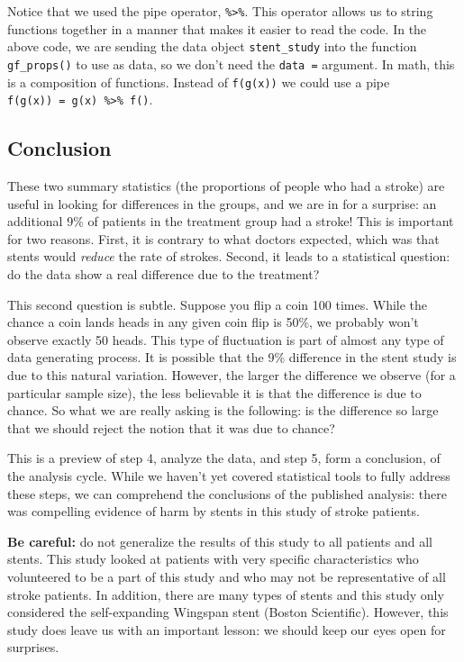 \documentclass[
  letterpaper,
  DIV=11,
  numbers=noendperiod]{scrreprt}
\begin{document}
Notice that we used the pipe operator, \texttt{\%\textgreater{}\%}. This
operator allows us to string functions together in a manner that makes
it easier to read the code. In the above code, we are sending the data
object \texttt{stent\_study} into the function \texttt{gf\_props()} to
use as data, so we don't need the \texttt{data\ =} argument. In math,
this is a composition of functions. Instead of \texttt{f(g(x))} we could
use a pipe \texttt{f(g(x))\ =\ g(x)\ \%\textgreater{}\%\ f()}.

\subsection{Conclusion}\label{conclusion}

These two summary statistics (the proportions of people who had a
stroke) are useful in looking for differences in the groups, and we are
in for a surprise: an additional 9\% of patients in the treatment group
had a stroke! This is important for two reasons. First, it is contrary
to what doctors expected, which was that stents would \emph{reduce} the
rate of strokes. Second, it leads to a statistical question: do the data
show a real difference due to the treatment?

This second question is subtle. Suppose you flip a coin 100 times. While
the chance a coin lands heads in any given coin flip is 50\%, we
probably won't observe exactly 50 heads. This type of fluctuation is
part of almost any type of data generating process. It is possible that
the 9\% difference in the stent study is due to this natural variation.
However, the larger the difference we observe (for a particular sample
size), the less believable it is that the difference is due to chance.
So what we are really asking is the following: is the difference so
large that we should reject the notion that it was due to chance?

This is a preview of step 4, analyze the data, and step 5, form a
conclusion, of the analysis cycle. While we haven't yet covered
statistical tools to fully address these steps, we can comprehend the
conclusions of the published analysis: there was compelling evidence of
harm by stents in this study of stroke patients.

\textbf{Be careful:} do not generalize the results of this study to all
patients and all stents. This study looked at patients with very
specific characteristics who volunteered to be a part of this study and
who may not be representative of all stroke patients. In addition, there
are many types of stents and this study only considered the
self-expanding Wingspan stent (Boston Scientific). However, this study
does leave us with an important lesson: we should keep our eyes open for
surprises.
\end{document}
